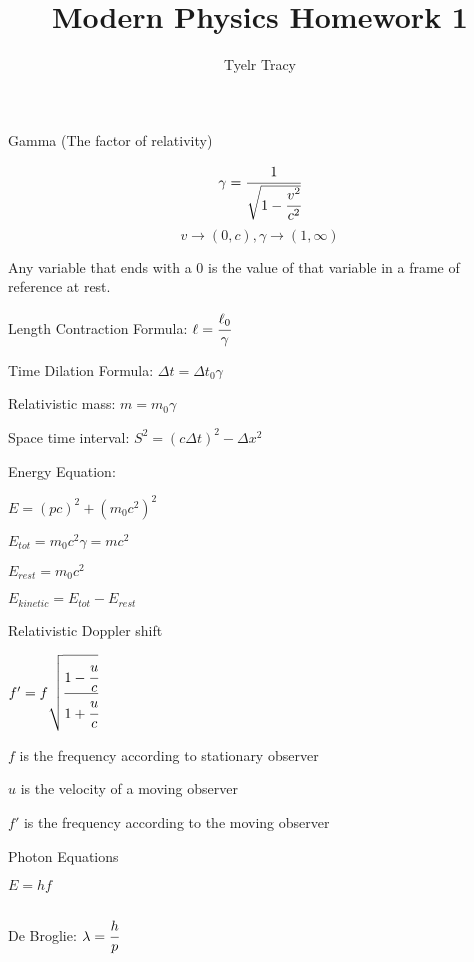 \documentclass{article}
\title{Modern Physics Homework 1}
\author{Tyelr Tracy}
\begin{document}
Gamma (The factor of relativity)

$$ \gamma = \cfrac{1}{\sqrt{1 - \cfrac{v^2}{c^2}}} $$
$$ v \rightarrow (0, c), \gamma \rightarrow (1, \infty) $$

Any variable that ends with a 0 is the value of that variable in a frame of reference at rest.


Length Contraction Formula: $\ell = \cfrac{\ell_0}{\gamma}$

Time Dilation Formula: $\Delta t = \Delta t_0 \gamma$

Relativistic mass: $m = m_0 \gamma$



Space time interval: $S^2 =  (c \Delta t)^2 - \Delta x^2 $


Energy Equation:

$E = (pc)^2 + (m_0c^2)^2$

$E_{tot} = m_0c^2\gamma = mc^2$

$E_{rest} = m_0c^2$

$E_{kinetic} = E_{tot} - E_{rest}$



Relativistic Doppler shift

$f' = f \sqrt{\cfrac{1- \cfrac{u}{c}}{1 + \cfrac{u}{c}}}$

\hspace*{10mm} $f$ is the frequency according to stationary observer

\hspace*{10mm} $u$ is the velocity of a moving observer

\hspace*{10mm} $f'$ is the frequency according to the moving observer


Photon Equations

$E = hf$

$  $


De Broglie: $ \lambda = \cfrac{h}{p} $
\end{document}
